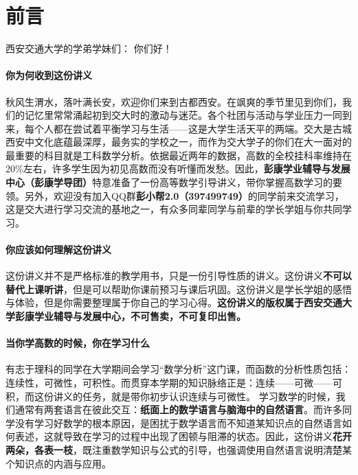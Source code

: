 \chapter*{前言}


西安交通大学的学弟学妹们： 你们好！

\subsubsection*{你为何收到这份讲义}
秋风生渭水，落叶满长安，欢迎你们来到古都西安。在飒爽的季节里见到你们，我们的记忆里常常涌起初到交大时的激动与迷茫。各个社团与活动与学业压力一同到来，每个人都在尝试着平衡学习与生活——这是大学生活天平的两端。交大是古城西安中文化底蕴最深厚，最务实的学校之一，而作为交大学子的你们在大一面对的最重要的科目就是工科数学分析。依据最近两年的数据，高数的全校挂科率维持在20\%左右，许多学生因为初见高数而没有听懂而发愁。因此，\textbf{彭康学业辅导与发展中心（彭康学导团）}特意准备了一份高等数学引导讲义，带你掌握高数学习的要领。另外，欢迎没有加入QQ群\textbf{彭小帮2.0（397499749）}的同学前来交流学习，这是交大进行学习交流的基地之一，有众多同辈同学与前辈的学长学姐与你共同学习。

\subsubsection*{你应该如何理解这份讲义}
这份讲义并不是严格标准的教学用书，只是一份引导性质的讲义。这份讲义\textbf{不可以替代上课听讲}，但是可以帮助你课前预习与课后巩固。这份讲义是学长学姐的感悟与体验，但是你需要整理属于你自己的学习心得。\textbf{这份讲义的版权属于西安交通大学彭康学业辅导与发展中心，不可售卖，不可复印出售。}

\subsubsection*{当你学高数的时候，你在学习什么}
有志于理科的同学在大学期间会学习“数学分析”这门课，而函数的分析性质包括：连续性，可微性，可积性。而贯穿本学期的知识脉络正是：连续——可微——可积，而这份讲义的任务，就是带你初步认识连续与可微性。 学习数学的时候，我们通常有两套语言在彼此交互：\textbf{纸面上的数学语言与脑海中的自然语言}。而许多同学没有学习好数学的根本原因，是困扰于数学语言而不知道某知识点的自然语言如何表述，这就导致在学习的过程中出现了困顿与阻滞的状态。因此，这份讲义\textbf{花开两朵，各表一枝}，既注重数学知识与公式的引导，也强调使用自然语言说明清楚某个知识点的内涵与应用。

